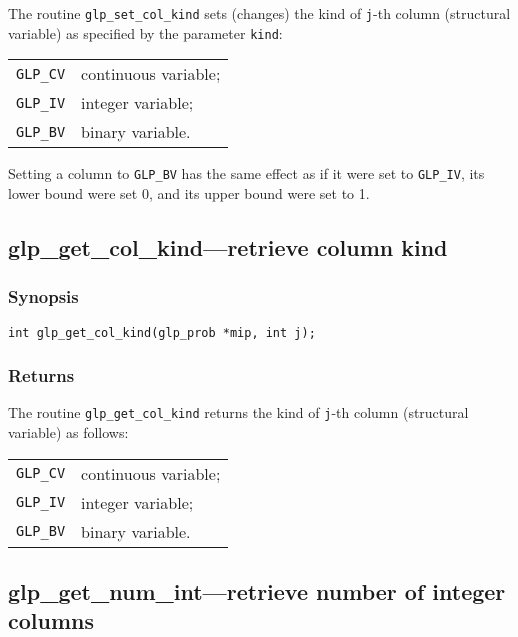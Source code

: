 The routine \verb|glp_set_col_kind| sets (changes) the kind of
\verb|j|-th column (structural variable) as specified by the parameter
\verb|kind|:

\begin{tabular}{@{}ll}
\verb|GLP_CV| & continuous variable; \\
\verb|GLP_IV| & integer variable; \\
\verb|GLP_BV| & binary variable. \\
\end{tabular}


Setting a column to \verb|GLP_BV| has the same effect as if it were
set to \verb|GLP_IV|, its lower bound were set 0, and its upper bound
were set to 1.

\subsection{glp\_get\_col\_kind---retrieve column kind}

\subsubsection*{Synopsis}

\begin{verbatim}
int glp_get_col_kind(glp_prob *mip, int j);
\end{verbatim}

\subsubsection*{Returns}

The routine \verb|glp_get_col_kind| returns the kind of \verb|j|-th
column (structural variable) as follows:

\begin{tabular}{@{}ll}
\verb|GLP_CV| & continuous variable; \\
\verb|GLP_IV| & integer variable; \\
\verb|GLP_BV| & binary variable. \\
\end{tabular}

\subsection{glp\_get\_num\_int---retrieve number of integer columns}

